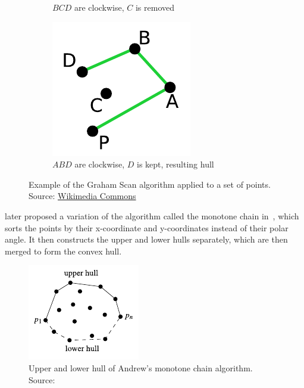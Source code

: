 \begin{figure}[h!]
\begin{subfigure}[b]{0.25\textwidth}
        \caption{$BCD$ are clockwise, $C$ is removed}
    \end{subfigure}%
    \hspace{0.05\textwidth} %
    \begin{subfigure}[b]{0.25\textwidth}
        \centering
        \includegraphics[width=0.9\linewidth]{images/graham3}
        \caption{$ABD$ are clockwise, $D$ is kept, resulting hull}
    \end{subfigure}%
    \caption{Example of the Graham Scan algorithm applied to a set of points. Source: \href{https://commons.wikimedia.org/wiki/File:Graham_Scan.svg}{Wikimedia Commons}}
    \label{fig:graham}
\end{figure}

\cite{andrew_another_1979} later proposed a variation of the algorithm called the
monotone chain in~\citeyear{andrew_another_1979}, which sorts the points by their
x-coordinate and y-coordinates instead of their polar angle.
It then constructs the upper and lower hulls separately, which are then merged to form the convex hull.


\begin{figure}[ht!]
    \centering
    \includegraphics[width=0.35\linewidth]{images/andrews}
    \caption{Upper and lower hull of Andrew's monotone chain algorithm. Source:~\cite{de_berg_computational_2008}}
\end{figure}


